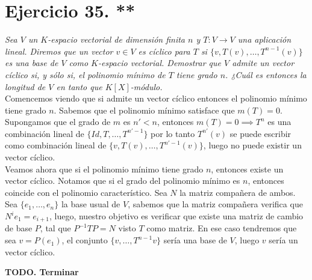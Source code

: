 \section{Ejercicio 35. **} \textit{Sea \(V\) un \(K\)-espacio
  vectorial de dimensión finita \(n\) y \(T:V \to V\) una
  aplicación lineal. Diremos que un vector \(v \in V\) es cíclico para
  \(T\) si \(\{v, T(v), \dots, T^{n-1}(v)\}\) es una base de \(V\)
  como \(K\)-espacio vectorial. Demostrar que \(V\) admite un vector cíclico si,
  y sólo si, el polinomio mínimo de \(T\) tiene grado \(n\). ¿Cuál es entonces
  la longitud de \(V\) en tanto que \(K[X]\)-módulo.}\\


Comencemos viendo que si admite un vector cíclico entonces el polinomio mínimo
tiene grado \(n\). Sabemos que el polinomio mínimo satisface que \(m(T)=0\). Supongamos que el
grado de \(m\) es \(n' < n\),  entonces \(m(T)=0 \implies T^{n}\) es una
combinación lineal de \(\{Id,T,\dots,T^{n'-1}\}\) por lo tanto \(T^{n'}(v)\) se
puede escribir como combinación lineal de \(\{v,T(v),\dots,T^{n'-1}(v)\}\),
luego no puede existir un vector cíclico.\\

Veamos ahora que si el polinomio mínimo tiene grado \(n\), entonces existe un
vector cíclico. Notamos que si el grado del polinomio mínimo es \(n\), entonces
coincide con el polinomio característico. Sea \(N\) la matriz compañera de
ambos. Sea \(\{e_1,\dots,e_n\}\) la base usual de \(V\), sabemos que la matriz
compañera verifica que \(N^i e_1 = e_{i+1}\), luego, nuestro objetivo es
verificar que existe una matriz de cambio de base \(P\), tal que \(P^{-1}TP =
N\) visto \(T\) como matriz. En ese caso tendremos que sea \(v = P(e_1)\), el conjunto
\(\{v,\dots,T^{n-1}v\}\) sería una base de \(V\), luego \(v\) sería un vector cíclico.

\textbf{TODO. Terminar}
